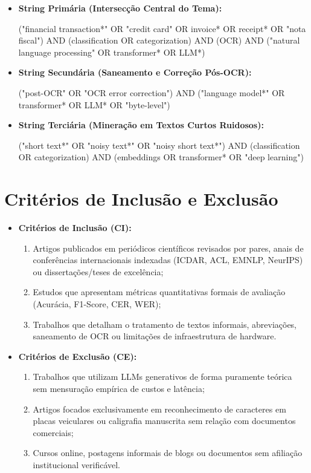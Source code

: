 \documentclass[
	12pt,				
	openright,			
	oneside,			
	a4paper,			
	english,			
	brazil				
	]{abntex2}
\begin{document}
\begin{itemize}
    \item \textbf{String Primária (Intersecção Central do Tema):}
    \begin{searchquery}
    ("financial transaction*" OR "credit card" OR invoice* OR receipt* OR "nota fiscal") AND (classification OR categorization) AND (OCR) AND ("natural language processing" OR transformer* OR LLM*)
    \end{searchquery}
    \vspace{4pt}
    
    \item \textbf{String Secundária (Saneamento e Correção Pós-OCR):}
    \begin{searchquery}
    ("post-OCR" OR "OCR error correction") AND ("language model*" OR transformer* OR LLM* OR "byte-level")
    \end{searchquery}
    \vspace{4pt}
    
    \item \textbf{String Terciária (Mineração em Textos Curtos Ruidosos):}
    \begin{searchquery}
    ("short text*" OR "noisy text*" OR "noisy short text*") AND (classification OR categorization) AND (embeddings OR transformer* OR "deep learning")
    \end{searchquery}
\end{itemize}

\section{Critérios de Inclusão e Exclusão}
\begin{itemize}
    \item \textbf{Critérios de Inclusão (CI):}
    \begin{enumerate}
        \item Artigos publicados em periódicos científicos revisados por pares, anais de conferências internacionais indexadas (ICDAR, ACL, EMNLP, NeurIPS) ou dissertações/teses de excelência;
        \item Estudos que apresentam métricas quantitativas formais de avaliação (Acurácia, F1-Score, CER, WER);
        \item Trabalhos que detalham o tratamento de textos informais, abreviações, saneamento de OCR ou limitações de infraestrutura de hardware.
    \end{enumerate}
    \item \textbf{Critérios de Exclusão (CE):}
    \begin{enumerate}
        \item Trabalhos que utilizam LLMs generativos de forma puramente teórica sem mensuração empírica de custos e latência;
        \item Artigos focados exclusivamente em reconhecimento de caracteres em placas veiculares ou caligrafia manuscrita sem relação com documentos comerciais;
        \item Cursos online, postagens informais de blogs ou documentos sem afiliação institucional verificável.
    \end{enumerate}
\end{itemize}
\end{document}
